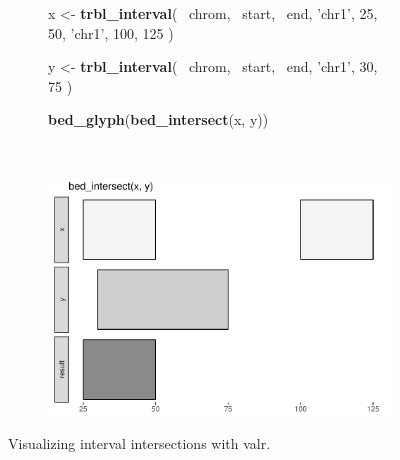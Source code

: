 \documentclass[9pt,a4paper]{extarticle}
\renewcommand{\KeywordTok}[1]{\textbf{{#1}}}
\renewcommand{\DecValTok}[1]{\textcolor[rgb]{0.00,0.00,1.00}{{#1}}}
\renewcommand{\StringTok}[1]{\textcolor[rgb]{0.87,0.00,0.00}{{#1}}}
\renewcommand{\NormalTok}[1]{{#1}}
\begin{document}
\begin{figure}
\centering
    \begin{subfigure}[b]{0.45\textwidth}
\begin{Shaded}
\begin{Highlighting}[]
\NormalTok{x <-}\StringTok{ }\KeywordTok{trbl_interval}\NormalTok{(}
  \NormalTok{~chrom, ~start, ~end,}
  \StringTok{'chr1'}\NormalTok{, }\DecValTok{25}\NormalTok{,     }\DecValTok{50}\NormalTok{,}
  \StringTok{'chr1'}\NormalTok{, }\DecValTok{100}\NormalTok{,    }\DecValTok{125}
\NormalTok{)}

\NormalTok{y <-}\StringTok{ }\KeywordTok{trbl_interval}\NormalTok{(}
  \NormalTok{~chrom, ~start, ~end,}
  \StringTok{'chr1'}\NormalTok{, }\DecValTok{30}\NormalTok{,     }\DecValTok{75}
\NormalTok{)}

\KeywordTok{bed_glyph}\NormalTok{(}\KeywordTok{bed_intersect}\NormalTok{(x, y))}
\end{Highlighting}
\end{Shaded}
        \label{fig:bed_glyph_code}
    \end{subfigure}
    ~
\begin{subfigure}[b]{0.45\textwidth}
        \includegraphics[width=\textwidth]{intersect_glyph-1.pdf}
        \label{fig:bed_glyph_out}
    \end{subfigure}
\caption{\label{fig:your-figure}Visualizing interval intersections with valr.	 }
\end{figure}
\end{document}
